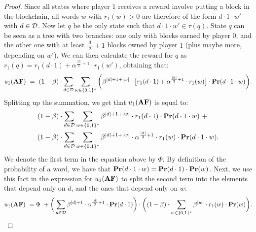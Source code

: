 \begin{proof}
Since all states where player $1$ receives a reward involve putting a block in the blockchain, all words 
$w$ with $r_1(w) > 0$ are therefore of the form $d\cdot 1\cdot w'$ with $d \in \mathcal{D}$. Now let $q$ be the only state such that $d\cdot 1\cdot w' \in \tau(q)$.
State $q$ can be seen as a tree with two branches: one only with blocks earned by player $0$, and the other one 
with at least ${\frac{|d|}{2}+1}$ blocks owned by player $1$ (plus maybe more, depending on $w'$). 
We can then calculate the reward for $q$ as $r_1(q) = r_1(d \cdot 1) + \alpha^{\frac{|d|}{2}+1}\cdot r_1(w')$, obtaining that:
\begin{align*}
u_1(\text{\rm {\bf AF}}) \ = \ (1-\beta) \cdot \sum_{d\in \mathcal{D}} \sum_{w\in \{0,1\}^*} \bigg(\beta^{|d|+1+|w|}\cdot 
 \big[r_1(d\cdot 1) + \alpha^{\frac{|d|}{2}+1}\cdot r_1(w)\big] \cdot \mathbf{Pr}(d\cdot 1 \cdot w)\bigg).
\end{align*}
%
Splitting up the summation, we get that $ u_1(\text{\rm {\bf AF}})$ is equal to:
\begin{align*}
&(1-\beta) \cdot \sum_{d\in \mathcal{D}} \sum_{w\in \{0,1\}^*}\beta^{|d|+1+|w|}\cdot r_1(d\cdot 1) \cdot \mathbf{Pr}(d\cdot 1\cdot w) \ +\\
 & (1-\beta) \cdot \sum_{d\in \mathcal{D}} \sum_{w\in \{0,1\}^*}\beta^{|d|+1+|w|}\cdot \alpha^{\frac{|d|}{2}+1}\cdot r_1(w) \cdot \mathbf{Pr}(d\cdot 1 \cdot w).
\end{align*}
%
We denote the first term in the equation above by $\Phi$. 
By definition of the probability of a word, we have that $\mathbf{Pr}(d\cdot 1\cdot w) = \mathbf{Pr}(d\cdot 1)\cdot \mathbf{Pr}(w)$. 
Next, we use this fact in the expression for $u_1(\text{\rm {\bf AF}})$ to split the second term into the elements that depend only on $d$, and the ones that depend only on $w$:
%
\begin{align*}
 u_1(\text{\rm {\bf AF}}) \ = \Phi \ + \bigg(\sum_{d\in \mathcal{D}} \beta^{|d|+1}\cdot \alpha^{\frac{|d|}{2}+1}\cdot \mathbf{Pr}(d\cdot 1)\bigg) \cdot 
 \bigg((1-\beta) \cdot \sum_{w\in \{0,1\}^*} \beta^{|w|} \cdot r_1(w) \cdot \mathbf{Pr}(w)\bigg).
\end{align*}

\end{proof}
